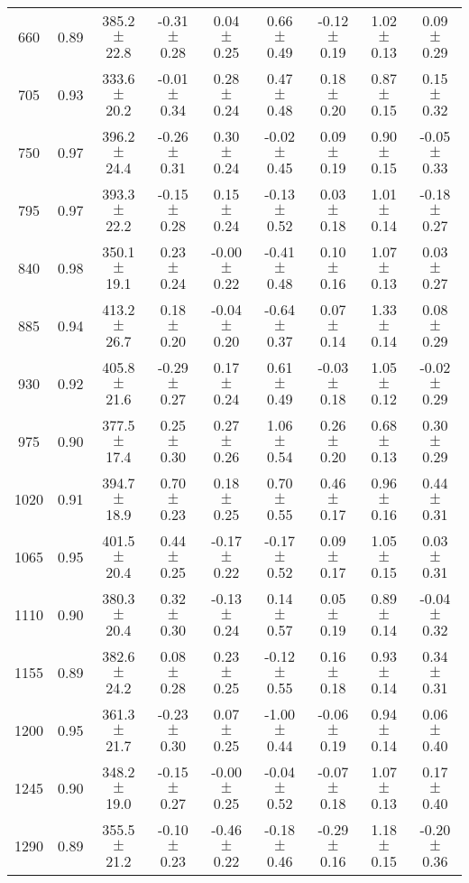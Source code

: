 \documentclass[twocolumn]{aastex61}%
\begin{document}
\begin{table*}[ht]
\begin{tabular}{ccc|ccccc|c}
660 & 0.89 & 385.2 $\pm$ 22.8 & -0.31 $\pm$ 0.28 & 0.04 $\pm$ 0.25 & 0.66 $\pm$ 0.49 & -0.12 $\pm$ 0.19 & 1.02 $\pm$ 0.13 & 0.09 $\pm$ 0.29\\
705 & 0.93 & 333.6 $\pm$ 20.2 & -0.01 $\pm$ 0.34 & 0.28 $\pm$ 0.24 & 0.47 $\pm$ 0.48 & 0.18 $\pm$ 0.20 & 0.87 $\pm$ 0.15 & 0.15 $\pm$ 0.32\\
750 & 0.97 & 396.2 $\pm$ 24.4 & -0.26 $\pm$ 0.31 & 0.30 $\pm$ 0.24 & -0.02 $\pm$ 0.45 & 0.09 $\pm$ 0.19 & 0.90 $\pm$ 0.15 & -0.05 $\pm$ 0.33\\
795 & 0.97 & 393.3 $\pm$ 22.2 & -0.15 $\pm$ 0.28 & 0.15 $\pm$ 0.24 & -0.13 $\pm$ 0.52 & 0.03 $\pm$ 0.18 & 1.01 $\pm$ 0.14 & -0.18 $\pm$ 0.27\\
840 & 0.98 & 350.1 $\pm$ 19.1 & 0.23 $\pm$ 0.24 & -0.00 $\pm$ 0.22 & -0.41 $\pm$ 0.48 & 0.10 $\pm$ 0.16 & 1.07 $\pm$ 0.13 & 0.03 $\pm$ 0.27\\
885 & 0.94 & 413.2 $\pm$ 26.7 & 0.18 $\pm$ 0.20 & -0.04 $\pm$ 0.20 & -0.64 $\pm$ 0.37 & 0.07 $\pm$ 0.14 & 1.33 $\pm$ 0.14 & 0.08 $\pm$ 0.29\\
930 & 0.92 & 405.8 $\pm$ 21.6 & -0.29 $\pm$ 0.27 & 0.17 $\pm$ 0.24 & 0.61 $\pm$ 0.49 & -0.03 $\pm$ 0.18 & 1.05 $\pm$ 0.12 & -0.02 $\pm$ 0.29\\
975 & 0.90 & 377.5 $\pm$ 17.4 & 0.25 $\pm$ 0.30 & 0.27 $\pm$ 0.26 & 1.06 $\pm$ 0.54 & 0.26 $\pm$ 0.20 & 0.68 $\pm$ 0.13 & 0.30 $\pm$ 0.29\\
1020 & 0.91 & 394.7 $\pm$ 18.9 & 0.70 $\pm$ 0.23 & 0.18 $\pm$ 0.25 & 0.70 $\pm$ 0.55 & 0.46 $\pm$ 0.17 & 0.96 $\pm$ 0.16 & 0.44 $\pm$ 0.31\\
1065 & 0.95 & 401.5 $\pm$ 20.4 & 0.44 $\pm$ 0.25 & -0.17 $\pm$ 0.22 & -0.17 $\pm$ 0.52 & 0.09 $\pm$ 0.17 & 1.05 $\pm$ 0.15 & 0.03 $\pm$ 0.31\\
1110 & 0.90 & 380.3 $\pm$ 20.4 & 0.32 $\pm$ 0.30 & -0.13 $\pm$ 0.24 & 0.14 $\pm$ 0.57 & 0.05 $\pm$ 0.19 & 0.89 $\pm$ 0.14 & -0.04 $\pm$ 0.32\\
1155 & 0.89 & 382.6 $\pm$ 24.2 & 0.08 $\pm$ 0.28 & 0.23 $\pm$ 0.25 & -0.12 $\pm$ 0.55 & 0.16 $\pm$ 0.18 & 0.93 $\pm$ 0.14 & 0.34 $\pm$ 0.31\\
1200 & 0.95 & 361.3 $\pm$ 21.7 & -0.23 $\pm$ 0.30 & 0.07 $\pm$ 0.25 & -1.00 $\pm$ 0.44 & -0.06 $\pm$ 0.19 & 0.94 $\pm$ 0.14 & 0.06 $\pm$ 0.40\\
1245 & 0.90 & 348.2 $\pm$ 19.0 & -0.15 $\pm$ 0.27 & -0.00 $\pm$ 0.25 & -0.04 $\pm$ 0.52 & -0.07 $\pm$ 0.18 & 1.07 $\pm$ 0.13 & 0.17 $\pm$ 0.40\\
1290 & 0.89 & 355.5 $\pm$ 21.2 & -0.10 $\pm$ 0.23 & -0.46 $\pm$ 0.22 & -0.18 $\pm$ 0.46 & -0.29 $\pm$ 0.16 & 1.18 $\pm$ 0.15 & -0.20 $\pm$ 0.36\\

\end{tabular}
\end{table*}
\end{document}
